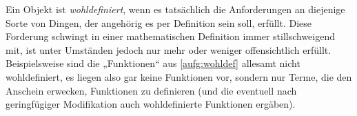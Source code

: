 \begin{description}[labelindent=0pt, leftmargin=0pt]
    \item[Wohldefiniert:]  Ein Objekt ist \emph{wohldefiniert}, wenn es tatsächlich die Anforderungen an diejenige Sorte von Dingen, der angehörig es per Definition sein soll, erfüllt. Diese Forderung schwingt in einer mathematischen Definition immer stillschweigend mit, ist unter Umständen jedoch nur mehr oder weniger offensichtlich erfüllt. Beispielsweise sind die „Funktionen“ aus \cref{aufg:wohldef} allesamt nicht wohldefiniert, es liegen also gar keine Funktionen vor, sondern nur Terme, die den Anschein erwecken, Funktionen zu definieren (und die eventuell nach geringfügiger Modifikation auch wohldefinierte Funktionen ergäben).

\end{description}





